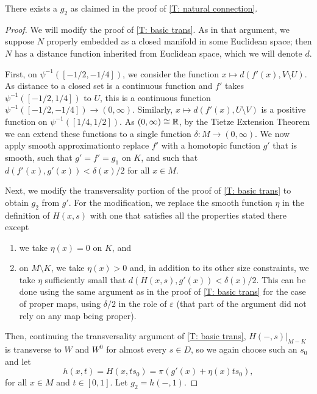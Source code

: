\begin{lemma}
	There exists a $g_2$ as claimed in the proof of \cref{T: natural connection}.
\end{lemma}

\begin{proof}
	We will modify the proof of \cref{T: basic trans}.
	As in that argument, we suppose $N$ properly embedded as a closed manifold in some Euclidean space; then $N$ has a distance function inherited from Euclidean space, which we will denote $d$.

	First, on $\psi^{-1}([-1/2,-1/4])$, we consider the function $x \mapsto d(f'(x), V \setminus U)$.
	As distance to a closed set is a continuous function and $f'$ takes $\psi^{-1}([-1/2,1/4])$ to $U$, this is a continuous function $\psi^{-1}([-1/2,-1/4]) \to (0,\infty)$.
	Similarly, $x \mapsto d(f'(x), U \setminus V)$ is a positive function on $\psi^{-1}([1/4, 1/2])$.
	As $(0,\infty) \cong \mathbb{R}$, by the Tietze Extension Theorem we can extend these functions to a single function $\delta \colon M \to (0, \infty)$.
	We now apply smooth approximation\footnotemark to replace $f'$ with a homotopic function $g'$ that is smooth, such that $g' = f' = g_1$ on $K$, and such that $d(f'(x),g'(x))<\delta(x)/2$ for all $x \in M$.

	Next, we modify the transversality portion of the proof of \cref{T: basic trans} to obtain $g_2$ from $g'$.
	For the modification, we replace the smooth function $\eta$ in the definition of $H(x,s)$ with one that satisfies all the properties stated there except
	\begin{enumerate}
		\item we take $\eta(x)=0$ on $K$, and
		\item on $M \setminus K$, we take $\eta(x) > 0$ and, in addition to its other size constraints, we take $\eta$ sufficiently small that $d(H(x,s),g'(x)) < \delta(x)/2$.
		This can be done using the same argument as in the proof of \cref{T: basic trans} for the case of proper maps, using $\delta/2$ in the role of $\varepsilon$ (that part of the argument did not rely on any map being proper).
	\end{enumerate}
	Then, continuing the transversality argument of \cref{T: basic trans}, $H(-,s)|_{M-K}$ is transverse to $W$ and $W^0$ for almost every $s \in D$, so we again choose such an $s_0$ and let $$h(x,t) = H(x, ts_0) = \pi(g'(x) + \eta(x)ts_0),$$ for all $x \in M$ and $t \in [0,1]$.
	Let $g_2 = h(-,1)$.


\end{proof}

